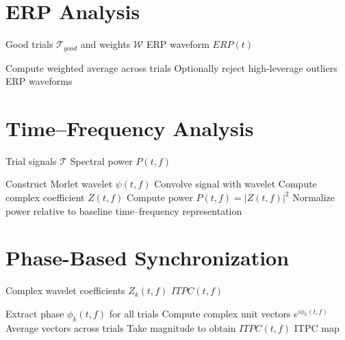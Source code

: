 \documentclass[11pt]{report}
\begin{document}
\section{ERP Analysis}

\begin{algorithm}[H]
\caption{Robust ERP estimation}
\begin{algorithmic}[1]
\Require Good trials $\mathcal{T}_{good}$ and weights $\mathcal{W}$
\Ensure ERP waveform $ERP(t)$

    \State Compute weighted average across trials
    \State Optionally reject high-leverage outliers
\EndFor
\State \Return ERP waveforms
\end{algorithmic}
\end{algorithm}

\section{Time--Frequency Analysis}

\begin{algorithm}[H]
\caption{Morlet wavelet time--frequency analysis}
\begin{algorithmic}[1]
\Require Trial signals $\mathcal{T}$
\Ensure Spectral power $P(t,f)$

        \State Construct Morlet wavelet $\psi(t,f)$
        \State Convolve signal with wavelet
        \State Compute complex coefficient $Z(t,f)$
        \State Compute power $P(t,f)=|Z(t,f)|^2$
    \EndFor
\EndFor
\State Normalize power relative to baseline
\State \Return time--frequency representation
\end{algorithmic}
\end{algorithm}

\section{Phase-Based Synchronization}

\begin{algorithm}[H]
\caption{Inter-trial phase coherence}
\begin{algorithmic}[1]
\Require Complex wavelet coefficients $Z_k(t,f)$
\Ensure $ITPC(t,f)$

    \State Extract phase $\phi_k(t,f)$ for all trials
    \State Compute complex unit vectors $e^{i\phi_k(t,f)}$
    \State Average vectors across trials
    \State Take magnitude to obtain $ITPC(t,f)$
\EndFor
\State \Return ITPC map
\end{algorithmic}
\end{algorithm}
\end{document}

